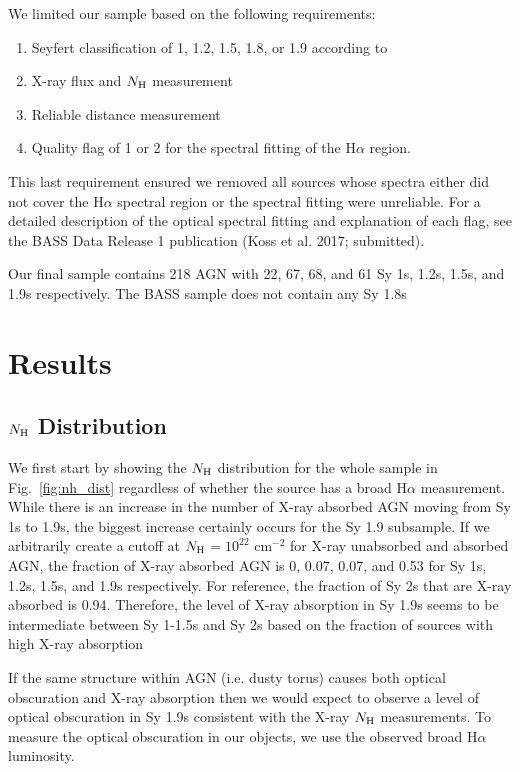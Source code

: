 \documentclass[twocolumn,trackchanges]{aastex6}
\newcommand{\halpha}{H$\alpha$}
\newcommand{\nh}{$N_{\rm H}$}
\begin{document}
We limited our sample based on the following requirements:
\begin{enumerate}\itemsep1pt
\item Seyfert classification of 1, 1.2, 1.5, 1.8, or 1.9 according to \citet{Winkler:1992kx}
\item X-ray flux and \nh{} measurement
\item Reliable distance measurement
\item Quality flag of 1 or 2 for the spectral fitting of the \halpha{} region.
\end{enumerate}

This last requirement ensured we removed all sources whose spectra either did not cover the \halpha{} spectral region or the spectral fitting were unreliable. For a detailed description of the optical spectral fitting and explanation of each flag, see the BASS Data Release 1 publication (Koss et al. 2017; submitted). 

Our final sample contains 218 AGN with 22, 67, 68, and 61 Sy 1s, 1.2s, 1.5s, and 1.9s respectively. The BASS sample does not contain any Sy 1.8s 
 
\section{Results}\label{sec:results}

\subsection{\nh{} Distribution}
We first start by showing the \nh{} distribution for the whole sample in Fig.~\ref{fig:nh_dist} regardless of whether the source has a broad \halpha{} measurement. While there is an increase in the number of X-ray absorbed AGN moving from Sy 1s to 1.9s, the biggest increase certainly occurs for the Sy 1.9 subsample. If we arbitrarily create a cutoff at \nh$=10^{22}$ cm$^{-2}$ for X-ray unabsorbed and absorbed AGN, the fraction of X-ray absorbed AGN is 0, 0.07, 0.07, and 0.53 for Sy 1s, 1.2s, 1.5s, and 1.9s respectively. For reference, the fraction of Sy 2s that are X-ray absorbed is 0.94. Therefore, the level of X-ray absorption in Sy 1.9s seems to be intermediate between Sy 1-1.5s and Sy 2s based on the fraction of sources with high X-ray absorption

If the same structure within AGN (i.e. dusty torus) causes both optical obscuration and X-ray absorption then we would expect to observe a level of optical obscuration in Sy 1.9s consistent with the X-ray \nh{} measurements. To measure the optical obscuration in our objects, we use the observed broad \halpha{} luminosity.
\end{document}
